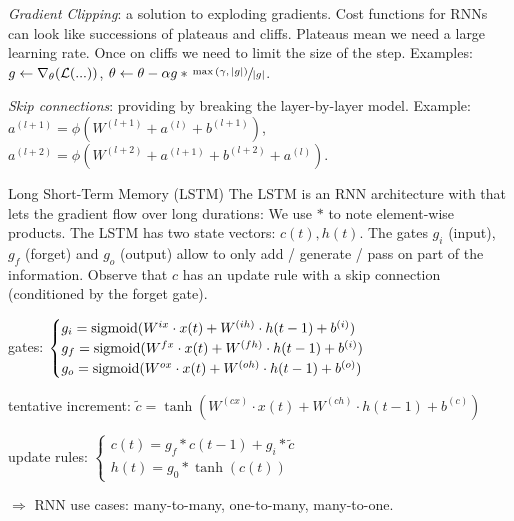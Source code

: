 \textit{Gradient Clipping}: a solution to exploding gradients.
Cost functions for RNNs can look like successions of plateaus and cliffs. 
Plateaus mean we need a large learning rate.
Once on cliffs we need to limit the size of the step.
Examples: $g\leftarrow \nabla_{\theta}(\mathcal{L}(...))$, $\theta \leftarrow \theta - \alpha g * \sfrac{\max{(\gamma, \lvert g \rvert)}}{\lvert g \rvert}$.

\textit{Skip connections}: providing  by breaking the layer-by-layer model. 
Example: $a^{(l+1)} = \phi (W^{(l+1)}+a^{(l)}+b^{(l+1)})$, 
$a^{(l+2)} = \phi (W^{(l+2)}+a^{(l+1)}+b^{(l+2)}+a^{(l)})$.

Long Short-Term Memory (LSTM)
The LSTM is an RNN architecture with  that lets the gradient flow over long durations:
We use $ * $ to note element-wise products.
The LSTM has two state vectors: $c(t), h(t)$.
The gates $g_i$ (input), $g_f$ (forget) and $g_o$ (output) allow to only add / generate / pass on part of the information. Observe that $c$ has an update rule with a skip connection (conditioned by the forget gate).

gates: $\begin{cases}
g_i = \mathrm{sigmoid}{(W^{ix}\cdot x(t) + W^{(ih)}\cdot h(t-1) + b^{(i)})} \\
g_f = \mathrm{sigmoid}{(W^{fx}\cdot x(t) + W^{(fh)}\cdot h(t-1) + b^{(i)})} \\
g_o = \mathrm{sigmoid}{(W^{ox}\cdot x(t) + W^{(oh)}\cdot h(t-1) + b^{(o)})}
\end{cases}$

tentative increment: $\tilde{c} = \tanh{(W^{(cx)}\cdot x(t) + W^{(ch)}\cdot h(t-1) + b^{(c)})}$

update rules: $\begin{cases}
c(t) = g_f * c(t-1) + g_i *\tilde{c} \\
h(t) = g_0 * \tanh{(c(t))}
\end{cases}$

$\Rightarrow$ RNN use cases: many-to-many, one-to-many, many-to-one.
